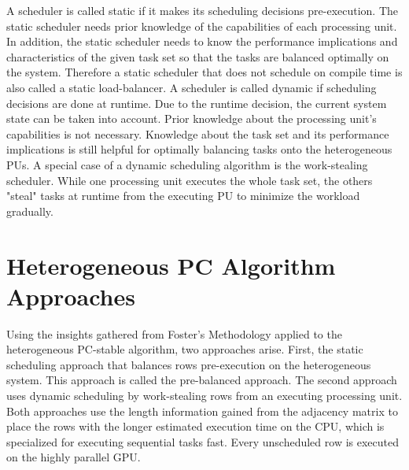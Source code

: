 A scheduler is called static if it makes its scheduling decisions pre-execution. The static scheduler needs prior knowledge of the capabilities of each processing unit. In addition, the static scheduler needs to know the performance implications and characteristics of the given task set so that the tasks are balanced optimally on the system. Therefore a static scheduler that does not schedule on compile time is also called a static load-balancer.
A scheduler is called dynamic if scheduling decisions are done at runtime. Due to the runtime decision, the current system state can be taken into account. Prior knowledge about the processing unit's capabilities is not necessary. Knowledge about the task set and its performance implications is still helpful for optimally balancing tasks onto the heterogeneous PUs.
A special case of a dynamic scheduling algorithm is the work-stealing scheduler. While one processing unit executes the whole task set, the others "steal" tasks at runtime from the executing PU to minimize the workload gradually.

\section{Heterogeneous PC Algorithm Approaches}
Using the insights gathered from Foster's Methodology applied to the heterogeneous PC-stable algorithm, two approaches arise. First, the static scheduling approach that balances rows pre-execution on the heterogeneous system. This approach is called the pre-balanced approach. The second approach uses dynamic scheduling by work-stealing rows from an executing processing unit. Both approaches use the length information gained from the adjacency matrix to place the rows with the longer estimated execution time on the CPU, which is specialized for executing sequential tasks fast. Every unscheduled row is executed on the highly parallel GPU.

